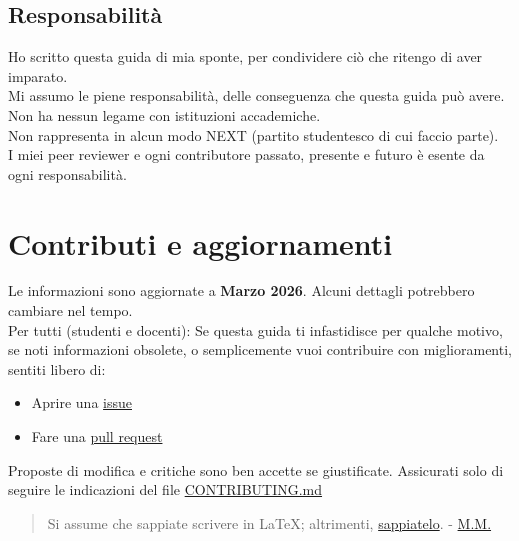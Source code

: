 \documentclass[18pt]{extarticle}
\begin{document}
\subsection{Responsabilità}
Ho scritto questa guida di mia sponte, per condividere ciò che ritengo di aver imparato.\\
Mi assumo le piene responsabilità, delle conseguenza che questa guida può avere.\\
Non ha nessun legame con istituzioni accademiche.\\
Non rappresenta in alcun modo NEXT (partito studentesco di cui faccio parte).\\
I miei peer reviewer e ogni contributore passato, presente e futuro è esente da ogni responsabilità.\\

\section{Contributi e aggiornamenti}
Le informazioni sono aggiornate a \textbf{Marzo 2026}. Alcuni dettagli potrebbero cambiare nel tempo.\\
Per tutti (studenti e docenti): Se questa guida ti infastidisce per qualche motivo, se noti informazioni obsolete, o semplicemente vuoi contribuire con miglioramenti, sentiti libero di:
\begin{itemize}
    \item Aprire una \href{https://github.com/Verryx-02/Scuola-di-sopravvivenza-per-studenti-di-Informatica/issues}{issue}
    \item Fare una \href{https://github.com/Verryx-02/Scuola-di-sopravvivenza-per-studenti-di-Informatica/pulls}{pull request}
\end{itemize}
Proposte di modifica e critiche sono ben accette se giustificate. Assicurati solo di seguire le indicazioni del file \href{https://github.com/Verryx-02/Scuola-di-sopravvivenza-per-studenti-di-Informatica/blob/main/CONTRIBUTING.md}{CONTRIBUTING.md}
\begin{quote}
Si assume che sappiate scrivere in \LaTeX; altrimenti, \href{https://www.learnlatex.org/it/}{sappiatelo}. - \href{https://github.com/miculan}{M.M.}
\end{quote}

\clearpage
\end{document}
